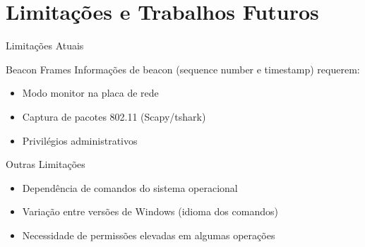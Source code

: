 \documentclass[aspectratio=169]{beamer}
\begin{document}
\section{Limitações e Trabalhos Futuros}

\begin{frame}{Limitações Atuais}
\begin{alertblock}{Beacon Frames}
Informações de beacon (sequence number e timestamp) requerem:
\begin{itemize}
    \item Modo monitor na placa de rede
    \item Captura de pacotes 802.11 (Scapy/tshark)
    \item Privilégios administrativos
\end{itemize}
\end{alertblock}

\vspace{0.5cm}

\begin{block}{Outras Limitações}
\begin{itemize}
    \item Dependência de comandos do sistema operacional
    \item Variação entre versões de Windows (idioma dos comandos)
    \item Necessidade de permissões elevadas em algumas operações
\end{itemize}
\end{block}
\end{frame}
\end{document}

